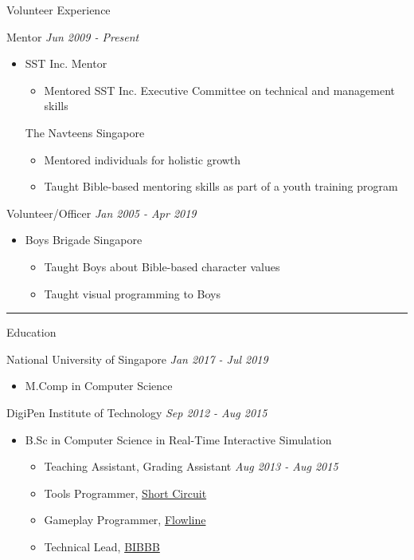\documentclass[letterpaper,11pt]{article}
\newcommand{\cvtitle}[1]{\huge\raggedright \textcolor{section_color}{#1}\\}
\newcommand{\cvhead}[1]{\large\raggedright \textcolor{subsection_color}{#1}\\}
\newcommand{\cvlist}[1]{\vspace{-12pt}\small \textcolor{item_color}{\begin{itemize}#1\end{itemize}}}
\newcommand{\cvli}[1]{\vspace{-4pt} \item{#1}}
\newcommand{\cvline}[0]{\noindent\rule{19cm}{0.4pt}}
\newcommand{\link}[2]{\textcolor{link_color}{\href{#1}{#2}}}
\newcommand{\qualifier}[1]{\hfill \textsl{\footnotesize #1}}
\begin{document}
\cvtitle{Volunteer Experience}
\cvhead{Mentor \qualifier{Jun 2009 - Present}}
\cvlist{
    \cvli{
        \cvhead{SST Inc. Mentor}
        \cvlist{
            \cvli{Mentored SST Inc. Executive Committee on technical and management skills}
        }
        \cvhead{The Navteens Singapore}
        \cvlist{
            \cvli{Mentored individuals for holistic growth}
            \cvli{Taught Bible-based mentoring skills as part of a youth training program}
        }
    }
}

\cvhead{Volunteer/Officer \qualifier{Jan 2005 - Apr 2019}}
\cvlist{
    \cvli{
        \cvhead{Boys Brigade Singapore}
        \cvlist{
            \cvli{Taught Boys about Bible-based character values}
            \cvli{Taught visual programming to Boys}
        }
    }
}

\vspace{-12pt}

\cvline

\cvtitle{Education}
\cvhead{National University of Singapore \qualifier{Jan 2017 - Jul 2019}}
\cvlist{
    \cvli{
        \cvhead{M.Comp in Computer Science}
    }
}

\cvhead{DigiPen Institute of Technology \qualifier{Sep 2012 - Aug 2015}}
\cvlist{
    \cvli{
        \cvhead{B.Sc in Computer Science in Real-Time Interactive Simulation}
        \cvlist{
            \cvli{Teaching Assistant, Grading Assistant \qualifier{Aug 2013 - Aug 2015}}
            \cvli{Tools Programmer, \link{http://games.digipen.edu/games/shortcircuit}{Short Circuit}}
            \cvli{Gameplay Programmer, \link{http://games.digipen.edu/games/flowline}{Flowline}}
            \cvli{Technical Lead, \link{http://games.digipen.edu/games/bibbb}{BIBBB}}
        }
    }
}
\end{document}
